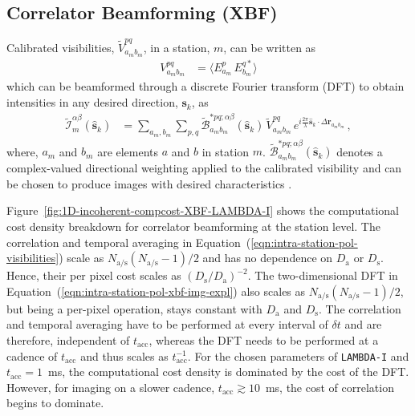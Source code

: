 \documentclass[
  journal=pasa,
  manuscript=article-type,
  year=2020,
  volume=37,
]{cup-journal}
\begin{document}
\subsection{Correlator Beamforming (XBF)}

Calibrated visibilities, $\widetilde{V}_{a_m b_m}^{pq}$, in a station, $m$, can be written as 
\begin{align}
    V_{a_m b_m}^{pq} &= \bigl\langle E_{a_m}^p \, E_{b_m}^{q*}\bigr\rangle \label{eqn:intra-station-pol-visibilities}
\end{align}
which can be beamformed through a discrete Fourier transform (DFT) to obtain intensities in any desired direction, $\boldsymbol{s}_k$, as
\begin{align}
    \widetilde{\mathcal{I}}_m^{\alpha\beta}(\hat{\boldsymbol{s}}_k) 
    &= \sum_{a_m,b_m} \sum_{p,q} \widetilde{\mathcal{B}}_{a_m b_m}^{*pq;\alpha\beta}(\hat{\boldsymbol{s}}_k) \, \widetilde{V}_{a_m b_m}^{pq} \,  e^{i\frac{2\pi}{\lambda} \hat{\boldsymbol{s}}_k\cdot\Delta\boldsymbol{r}_{a_m b_m}} \, , \label{eqn:intra-station-pol-xbf-img-expl} 
\end{align}
where, $a_m$ and $b_m$ are elements $a$ and $b$ in station $m$. $\widetilde{\mathcal{B}}_{a_m b_m}^{*pq;\alpha\beta}(\hat{\boldsymbol{s}}_k)$ denotes a complex-valued directional weighting applied to the calibrated visibility and can be chosen to produce images with desired characteristics \citep{Masui+2019}. 

Figure~\ref{fig:1D-incoherent-compcost-XBF-LAMBDA-I} shows the computational cost density breakdown for correlator beamforming at the station level. The correlation and temporal averaging in Equation~(\ref{eqn:intra-station-pol-visibilities}) scale as $N_\textrm{a/s}(N_\textrm{a/s}-1)/2$ and has no dependence on $D_\textrm{a}$ or $D_\textrm{s}$. Hence, their per pixel cost scales as $(D_\textrm{s}/D_\textrm{a})^{-2}$. The two-dimensional DFT in Equation~(\ref{eqn:intra-station-pol-xbf-img-expl}) also scales as $N_\textrm{a/s}(N_\textrm{a/s}-1)/2$, but being a per-pixel operation, stays constant with $D_\textrm{a}$ and $D_\textrm{s}$. The correlation and temporal averaging have to be performed at every interval of $\delta t$ and are therefore, independent of $t_\textrm{acc}$, whereas the DFT needs to be performed at a cadence of $t_\textrm{acc}$ and thus scales as $t_\textrm{acc}^{-1}$. For the chosen parameters of \texttt{LAMBDA-I} and $t_\textrm{acc}=1$~ms, the computational cost density is dominated by the cost of the DFT. However, for imaging on a slower cadence, $t_\textrm{acc}\gtrsim 10$~ms, the cost of correlation begins to dominate. 
\end{document}
